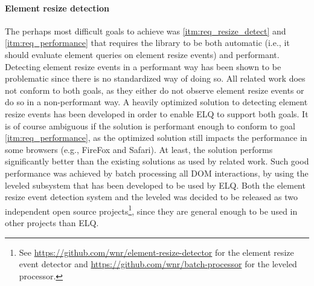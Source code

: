 \documentclass[a4paper,11pt]{kth-mag}
\begin{document}
    \paragraph{Element resize detection}
    The perhaps most difficult goals to achieve was \ref{itm:req_resize_detect} and \ref{itm:req_performance} that requires the library to be both automatic (i.e., it should evaluate element queries on element resize events) and performant.
    Detecting element resize events in a performant way has been shown to be problematic since there is no standardized way of doing so.
    All related work does not conform to both goals, as they either do not observe element resize events or do so in a non-performant way.
    A heavily optimized solution to detecting element resize events has been developed in order to enable \gls{ELQ} to support both goals.
    It is of course ambiguous if the solution is performant enough to conform to goal \ref{itm:req_performance}, as the optimized solution still impacts the performance in some \glspl{browser} (e.g., FireFox and Safari).
    At least, the solution performs significantly better than the existing solutions as used by related work.
    Such good performance was achieved by \gls{batch processing} all \gls{DOM} interactions, by using the leveled  subsystem that has been developed to be used by \gls{ELQ}.
    Both the element resize event detection system and the leveled  was decided to be released as two independent open source projects\footnote{See \url{https://github.com/wnr/element-resize-detector} for the element resize event detector and \url{https://github.com/wnr/batch-processor} for the leveled  processor.}, since they are general enough to be used in other projects than \gls{ELQ}.
\end{document}
